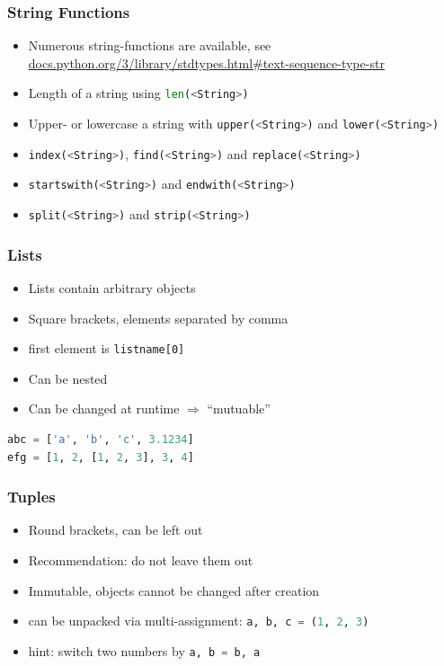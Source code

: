 \documentclass[english]{beamer}
\begin{document}
\begin{frame}[containsverbatim]
\frametitle{String Functions}

\begin{itemize}
\item Numerous string-functions are available, see \url{docs.python.org/3/library/stdtypes.html#text-sequence-type-str} 
\item Length of a string using \lstinline[language={Python}]{len(<String>)}
\item Upper- or lowercase a string with \lstinline[language={Python}]{upper(<String>)} and \lstinline[language={Python}]{lower(<String>)}
\item \lstinline[language={Python}]{index(<String>)}, \lstinline[language={Python}]{find(<String>)} and \lstinline[language={Python}]{replace(<String>)}
\item \lstinline[language={Python}]{startswith(<String>)} and \lstinline[language={Python}]{endwith(<String>)}
\item \lstinline[language={Python}]{split(<String>)} and \lstinline[language={Python}]{strip(<String>)}
\end{itemize}

\end{frame}



\begin{frame}[containsverbatim]
\frametitle{Lists}

\begin{itemize}
\item Lists contain arbitrary objects
\item Square brackets, elements separated by comma
\item first element is \texttt{listname[0]}
\item Can be nested
\item Can be changed at runtime $\Rightarrow$ \enquote{mutuable}
\end{itemize}

\begin{lstlisting}[language={Python}]
abc = ['a', 'b', 'c', 3.1234]
efg = [1, 2, [1, 2, 3], 3, 4]
\end{lstlisting}

\end{frame}

\begin{frame}
\frametitle{Tuples}

\begin{itemize}
\item Round brackets, can be left out
\item Recommendation: do not leave them out
\item Immutable, objects cannot be changed after creation
\item can be unpacked via multi-assignment: \lstinline[language={Python}]{a, b, c = (1, 2, 3)}
\item hint: switch two numbers by \lstinline[language={Python}]{a, b = b, a}
\end{itemize}
\end{frame}
\end{document}
